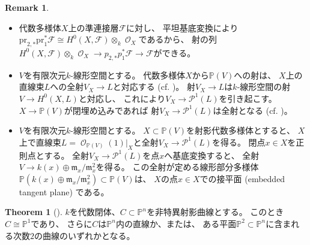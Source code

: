 \documentclass[uplatex]{jsarticle}
\theoremstyle{definition}
\newtheorem{thm}{Theorem}%
\newtheorem{rem}[rem]{Remark}
\renewcommand{\P}{\mathbb{P}}
\newcommand{\mcF}{\mathcal{F}}
\newcommand{\mcO}{\mathcal{O}}
\newcommand{\mcP}{\mathcal{P}}
\DeclareMathOperator{\OOO}{\mcO}
\newcommand{\OX}{{\OOO_X}}
\newcommand{\OO}[1]{\OOO_{#1}}
\begin{document}
\begin{rem}
   \
  \begin{itemize}
    \item
    代数多様体\(X\)上の準連接層\(\mcF\)に対し、
    平坦基底変換により
    \(\mathrm{pr}_{2,*}\mathrm{pr}_1^*\mcF\cong H^0(X,\mcF)\otimes_k \OX\)であるから、
    射の列\(H^0(X,\mcF)\otimes_k \OX\to p_{2,*}p_1^*\mcF\to \mcF\)ができる。
    \item
    \(V\)を有限次元\(k\)-線形空間とする。
    代数多様体\(X\)から\(\P(V)\)への射は、
    \(X\)上の直線束\(L\)への全射\(V_X\to L\)と対応する
    (cf. \cite[Theorem II.7.12]{Ha})。
    射\(V_X\to L\)は\(k\)-線形空間の射\(V\to H^0(X,L)\)と対応し、
    これにより\(V_X\to \mcP^1(L)\)を引き起こす。
    \(X\to \P(V)\)が閉埋め込みであれば
    射\(V_X\to \mcP^1(L)\)は全射となる
    (cf. \cite{YJ})。
    \item
    \(V\)を有限次元\(k\)-線形空間とする。
    \(X\subset \P(V)\)を射影代数多様体とすると、
    \(X\)上で直線束\(L=\OO{\P(V)}(1)|_X\)と全射\(V_X\to \mcP^1(L)\)を得る。
    閉点\(x\in X\)を正則点とする。
    全射\(V_X\to \mcP^1(L)\)を点\(x\)へ基底変換すると、
    全射\(V\to k(x)\oplus \mathfrak{m}_x/\mathfrak{m}_x^2\)を得る。
    この全射が定める線形部分多様体
    \(\P(k(x)\oplus \mathfrak{m}_x/\mathfrak{m}_x^2)\subset \P(V)\)は、
    \(X\)の点\(x\in X\)での接平面 (embedded tangent plane) である。
  \end{itemize}
\end{rem}




\begin{thm}[{\cite[定理 IV.3.9]{Ha}}]
  \(k\)を代数閉体、\(C\subset \P^n\)を非特異射影曲線とする。
  このとき\(C\cong \P^1\)であり、
  さらに\(C\)は\(\P^n\)内の直線か、または、
  ある平面\(\P^2\subset \P^n\)に含まれる次数\(2\)の曲線のいずれかとなる。
\end{thm}
\end{document}
